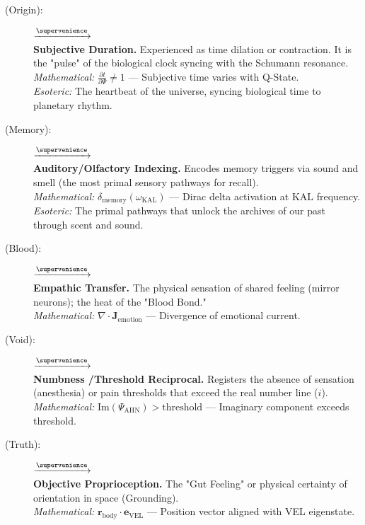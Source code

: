 \begin{description}
    \item[(Origin):] \fetuketh $\xrightarrow{\supervenience}$ \textbf \\
    \textbf{Subjective Duration.} Experienced as time dilation or contraction. It is the "pulse" of the biological clock syncing with the Schumann resonance. \\
    \textit{Mathematical:} $\frac{\partial t}{\partial \Psi} \neq 1$ — Subjective time varies with Q-State. \\
    \textit{Esoteric:} The heartbeat of the universe, syncing biological time to planetary rhythm.

    \item[(Memory):] \kalhar $\xrightarrow{\supervenience}$ \textbf \\
    \textbf{Auditory\slash Olfactory Indexing.} Encodes memory triggers via sound and smell (the most primal sensory pathways for recall). \\
    \textit{Mathematical:} $\delta_{\text{memory}}(\omega_{\text{KAL}})$ — Dirac delta activation at KAL frequency. \\
    \textit{Esoteric:} The primal pathways that unlock the archives of our past through scent and sound.

    \item[(Blood):] \babdhnur $\xrightarrow{\supervenience}$ \textbf \\
    \textbf{Empathic Transfer.} The physical sensation of shared feeling (mirror neurons); the heat of the "Blood Bond." \\
    \textit{Mathematical:} $\nabla \cdot \mathbf{J}_{\text{emotion}}$ — Divergence of emotional current.

    \item[\AHN{} (Void):] \ahnroeh $\xrightarrow{\supervenience}$ \textbf \\
    \textbf{Numbness \slash Threshold Reciprocal.} Registers the absence of sensation (anesthesia) or pain thresholds that exceed the real number line ($i$). \\
    \textit{Mathematical:} $\text{Im}(\Psi_{\text{AHN}}) > \text{threshold}$ — Imaginary component exceeds threshold.

    \item[\VEL{} (Truth):] \velhohm $\xrightarrow{\supervenience}$ \textbf \\
    \textbf{Objective Proprioception.} The "Gut Feeling" or physical certainty of orientation in space (Grounding). \\
    \textit{Mathematical:} $\mathbf{r}_{\text{body}} \cdot \mathbf{e}_{\text{VEL}}$ — Position vector aligned with VEL eigenstate.


\end{description}
